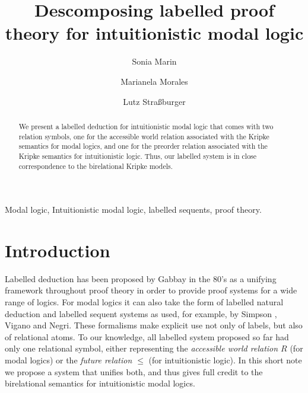 \documentclass[twoside]{aiml18}
\begin{document}
\begin{frontmatter}
  \title{Descomposing labelled proof theory for intuitionistic modal logic}
  \author{Sonia Marin}
  \address{Affiliation \\ Address }
 \author{Marianela Morales}
 \address{Affiliation \\ Address \\ Address}
   \author{Lutz Stra{\ss}burger}
 \address{Inria Salclay \& LIX, Ecole polytechnique \\ France}

 \begin{abstract}
   We present a labelled deduction for intuitionistic modal logic that
   comes with two relation symbols, one for the accessible world
   relation associated with the Kripke semantics for modal logics, and
   one for the preorder relation associated with the Kripke semantics
   for intuitionistic logic. Thus, our labelled system is in close
   correspondence to the birelational Kripke models.


  \end{abstract}

  \begin{keyword}
  Modal logic, Intuitionistic modal logic, labelled sequents, proof theory.
  \end{keyword}
 \end{frontmatter}


\section{Introduction}

Labelled deduction has been proposed by Gabbay in the 80’s as a
unifying framework throughout proof theory in order to provide proof
systems for a wide range of logics. For modal logics it can also take
the form of labelled natural deduction and labelled sequent systems as
used, for example, by Simpson \cite{Simpson}, Vigano \cite{Vigano} and
Negri\cite{Negri}. These formalisms make explicit use not only of
labels, but also of relational atoms. To our knowledge, all labelled
system proposed so far had only one relational symbol, either
representing the \emph{accessible world relation $R$} (for modal
logics) or the \emph{future relation $\le$} (for intuitionistic
logic). In this short note we propose a system that unifies both, and
thus gives full credit to the birelational semantics for
intuitionistic modal logics.
\end{document}
